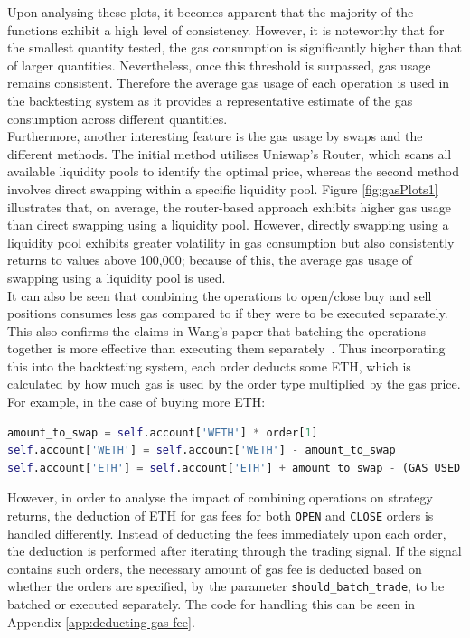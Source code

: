 \noindent Upon analysing these plots, it becomes apparent that the majority of the functions exhibit a high level of consistency. However, it is noteworthy that for the smallest quantity tested, the gas consumption is significantly higher than that of larger quantities. Nevertheless, once this threshold is surpassed, gas usage remains consistent. Therefore the average gas usage of each operation is used in the backtesting system as it provides a representative estimate of the gas consumption across different quantities.
\\[3mm]
Furthermore, another interesting feature is the gas usage by swaps and the different methods. The initial method utilises Uniswap's Router, which scans all available liquidity pools to identify the optimal price, whereas the second method involves direct swapping within a specific liquidity pool. Figure \ref{fig:gasPlots1} illustrates that, on average, the router-based approach exhibits higher gas usage than direct swapping using a liquidity pool. However, directly swapping using a liquidity pool exhibits greater volatility in gas consumption but also consistently returns to values above 100,000; because of this, the average gas usage of swapping using a liquidity pool is used.
\\[3mm]
It can also be seen that combining the operations to open/close buy and sell positions consumes less gas compared to if they were to be executed separately. This also confirms the claims in Wang's paper that batching the operations together is more effective than executing them separately~\cite {wang_cyclic_2022}. Thus incorporating this into the backtesting system, each order deducts some ETH, which is calculated by how much gas is used by the order type multiplied by the gas price. For example, in the case of buying more ETH:
\begin{lstlisting}[language=Python]
amount_to_swap = self.account['WETH'] * order[1]
self.account['WETH'] = self.account['WETH'] - amount_to_swap
self.account['ETH'] = self.account['ETH'] + amount_to_swap - (GAS_USED_BY_BUYING_ETH * gas_price_in_eth)
\end{lstlisting}
\vspace{5mm}
\noindent However, in order to analyse the impact of combining operations on strategy returns, the deduction of ETH for gas fees for both \texttt{OPEN} and \texttt{CLOSE} orders is handled differently. Instead of deducting the fees immediately upon each order, the deduction is performed after iterating through the trading signal. If the signal contains such orders, the necessary amount of gas fee is deducted based on whether the orders are specified, by the parameter \texttt{should\_batch\_trade}, to be batched or executed separately. The code for handling this can be seen in Appendix \ref{app:deducting-gas-fee}.

